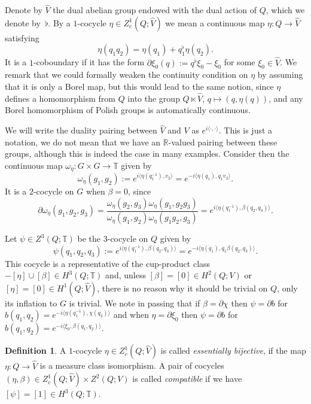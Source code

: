 \documentclass[a4paper,11pt,reqno]{amsart}
\numberwithin{equation}{section}
\theoremstyle{remark}
\theoremstyle{definition}
\newtheorem{definition}[theorem]{Definition}
\newcommand{\R}{{\mathbb R}}
\newcommand\T{{\mathbb T}}
\begin{document}
Denote by $\hat V$ the dual abelian group endowed with the dual action of $Q$, which we denote by~$\flat$.
By a $1$-cocycle $\eta\in Z^1_c(Q;\hat V)$ we mean a continuous map $\eta\colon Q\to\hat V$ satisfying
$$
\eta(q_1q_2)=\eta(q_1)+q_1^\flat\eta(q_2).
$$
It is a $1$-coboundary if it has the form $\partial\xi_0(q):=q^\flat\xi_0-\xi_0$ for some $\xi_0\in\hat V$. We remark that we could formally weaken the continuity condition on $\eta$ by assuming that it is only a Borel map, but this would lead to the same notion, since $\eta$ defines a homomorphism from $Q$ into the group $Q\ltimes\hat V$, $q\mapsto(q,\eta(q))$, and any Borel homomorphism of Polish groups is automatically continuous.

We will write the duality pairing between  $\hat V$ and $V$ as $e^{i \langle\cdot,\cdot\rangle}$. This is just a notation, we do not mean that we have an $\R$-valued pairing between  these groups, although this is indeed the case in many examples. Consider then the continuous map $\omega_\eta:G\times G\to \T$ given by
\begin{equation}\label{eq:omega-eta}
\omega_\eta(g_1,g_2):=e^{i \langle\eta(q_1^{-1}),v_2\rangle}=e^{-i \langle\eta(q_1),q_1v_2\rangle}.
\end{equation}
It is a $2$-cocycle on $G$ when $\beta=0$, since
$$
\partial \omega_\eta(g_1,g_2,g_3)=\frac{ \omega_\eta(g_2,g_3) \omega_\eta(g_1,g_2g_3)}{ \omega_\eta(g_1,g_2) \omega_\eta(g_1g_2,g_3)}
=e^{i\langle\eta(q_1^{-1}),\beta(q_2,q_3)\rangle}.
$$

Let  $\psi \in Z^3(Q;\T)$ be the $3$-cocycle on $Q$ given by
\begin{equation}\label{eq:psi}
\psi (q_1,q_2,q_3):=e^{i\langle\eta(q_1^{-1}),\beta(q_2,q_3)\rangle}=e^{-i\langle\eta(q_1),q_1\beta(q_2,q_3)\rangle}.
\end{equation}
This cocycle is a representative of the cup-product class $-[\eta]\cup[\beta]\in H^3(Q;\T)$ and,
unless $[\beta]=[0]\in H^2(Q;V)$ or $[\eta]=[0]\in H^1(Q;\hat V)$, there is no reason why it should be trivial on $Q$, only its inflation to $G$ is trivial.
We note in passing that if $\beta=\partial \chi$ then $\psi=\partial b$ for $b(q_1,q_2)=e^{-i\langle \eta(q_1^{-1}),\chi(q_2)\rangle}$ and when
$\eta=\partial\xi_0$ then $\psi=\partial b$ for $b(q_1,q_2)=e^{-i\langle \xi_0,\beta(q_1,q_2)\rangle}$.
\begin{definition}\label{def:compatible}
A $1$-cocycle $\eta\in Z^1_c(Q;\hat V)$ is called {\em essentially bijective}, if the map $\eta\colon Q\to \hat V$ is a measure class isomorphism.
A pair of cocycles $(\eta,\beta)\in Z^1_c(Q;\hat V)\times Z^2(Q;V)$ is called {\em compatible} if we have  $[\psi]=[1]\in H^3(Q;\T)$.
\end{definition}
\end{document}
